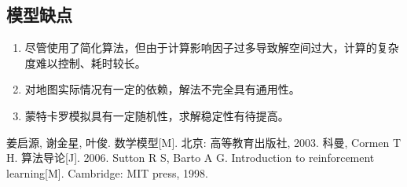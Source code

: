\documentclass[withoutpreface,bwprint]{cumcmthesis} %
\begin{document}
\subsection{模型缺点}
\begin{enumerate}
    \item 尽管使用了简化算法，但由于计算影响因子过多导致解空间过大，计算的复杂度难以控制、耗时较长。
    \item 对地图实际情况有一定的依赖，解法不完全具有通用性。
    \item 蒙特卡罗模拟具有一定随机性，求解稳定性有待提高。
\end{enumerate}



\begin{thebibliography}{9}%
     姜启源, 谢金星, 叶俊. 数学模型[M]. 北京: 高等教育出版社, 2003.
     科曼, Cormen T H. 算法导论[J]. 2006.
     Sutton R S, Barto A G. Introduction to reinforcement learning[M]. Cambridge: MIT press, 1998.

\end{thebibliography}
\end{document}
